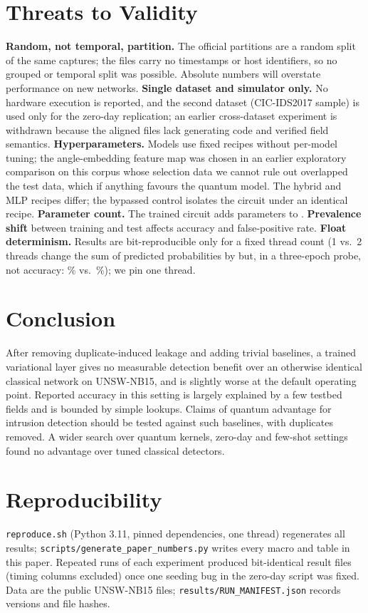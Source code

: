 \IfFileExists{IEEEtran.cls}{\documentclass[conference]{IEEEtran}}{\documentclass[10pt,twocolumn]{article}\usepackage[margin=0.8in]{geometry}}
\begin{document}
\section{Threats to Validity}
\textbf{Random, not temporal, partition.} The official partitions are a random split of the same captures; the files carry no timestamps or host identifiers, so no grouped or temporal split was possible. Absolute numbers will overstate performance on new networks. \textbf{Single dataset and simulator only.} No hardware execution is reported, and the second dataset (CIC-IDS2017 sample) is used only for the zero-day replication; an earlier cross-dataset experiment is withdrawn because the aligned files lack generating code and verified field semantics. \textbf{Hyperparameters.} Models use fixed recipes without per-model tuning; the angle-embedding feature map was chosen in an earlier exploratory comparison on this corpus whose selection data we cannot rule out overlapped the test data, which if anything favours the quantum model. The hybrid and MLP recipes differ; the bypassed control isolates the circuit under an identical recipe. \textbf{Parameter count.} The trained circuit adds \paramsVqc{} parameters to \paramsMlp{}. \textbf{Prevalence shift} between training and test affects accuracy and false-positive rate. \textbf{Float determinism.} Results are bit-reproducible only for a fixed thread count (1 vs.\ 2 threads change the sum of predicted probabilities by \threadSumPDiff{} but, in a three-epoch probe, not accuracy: \threadAccOne\% vs.\ \threadAccTwo\%); we pin one thread.

\section{Conclusion}
After removing duplicate-induced leakage and adding trivial baselines, a trained variational layer gives no measurable detection benefit over an otherwise identical classical network on UNSW-NB15, and is slightly worse at the default operating point. Reported accuracy in this setting is largely explained by a few testbed fields and is bounded by simple lookups. Claims of quantum advantage for intrusion detection should be tested against such baselines, with duplicates removed. A wider search over quantum kernels, zero-day and few-shot settings found no advantage over tuned classical detectors.

\section*{Reproducibility}
\texttt{reproduce.sh} (Python 3.11, pinned dependencies, one thread) regenerates all results; \texttt{scripts/generate\_paper\_numbers.py} writes every macro and table in this paper. Repeated runs of each experiment produced bit-identical result files (timing columns excluded) once one seeding bug in the zero-day script was fixed. Data are the public UNSW-NB15 files; \texttt{results/RUN\_MANIFEST.json} records versions and file hashes.
\end{document}

